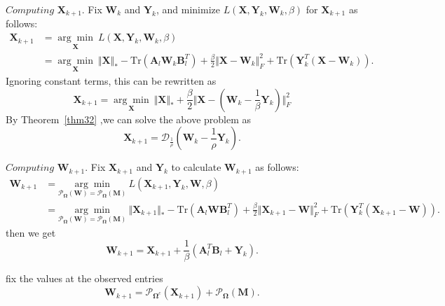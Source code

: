 \documentclass[fontset=windows]{article}
\begin{document}
{$\textit{Computing}$  $\mathbf X_{k+1}$. Fix $\mathbf W_k$ and $\mathbf Y_k$, and minimize $L(\mathbf X,\mathbf Y_k,\mathbf W_k,\beta)$ for $\mathbf X_{k+1}$ as follows:
\begin{equation}
\begin{aligned}
    \mathbf X_{k+1} & =\underset{\mathbf X}{\arg\min}\ L(\mathbf X,\mathbf Y_k, \mathbf W_k,\beta) \\
    & =  \underset{\mathbf X}{\arg\min} \ \Vert\mathbf X \Vert_* - \text{Tr}(\mathbf A_l\mathbf W_k\mathbf B_l^T)    + \frac{\beta}{2}\Vert\mathbf X-\mathbf W_k \Vert_F^2 + \text{Tr}(\mathbf Y_k^T(\mathbf X-\mathbf W_k)).
\end{aligned}
\end{equation}
Ignoring constant terms, this can be rewritten as 
\begin{equation}
    \mathbf X_{k+1} = \underset{\mathbf X}{\arg\min} \ \Vert\mathbf X \Vert_* + \frac{\beta}{2} \Vert\mathbf X-\left(\mathbf W_k - \frac{1}{\beta}\mathbf Y_k \right) \Vert_F^2
\end{equation}
By Theorem~\ref{thm32} ,we can solve the above problem as
\begin{equation}
    \mathbf X_{k+1} = \mathcal{D}_{\frac{1}{\rho}}(\mathbf W_k - \frac{1}{\rho}\mathbf Y_k).
\label{admmx}
\end{equation}


$\textit{Computing}$  $\mathbf W_{k+1}$. Fix $\mathbf X_{k+1}$ and $\mathbf Y_k$ to calculate $\mathbf W_{k+1}$ as follows:
\begin{equation}
\begin{aligned}
    \mathbf W_{k+1}& = \underset{\mathcal{P}_{\mathbf\Omega}(\mathbf W) = \mathcal{P}_{\mathbf\Omega}(\mathbf M)}{\arg\min} \ L(\mathbf X_{k+1},\mathbf Y_k,\mathbf W,\beta) \\
    & =  \underset{\mathcal{P}_{\mathbf\Omega}(\mathbf W) = \mathcal{P}_{\mathbf\Omega}(\mathbf M)}{\arg\min} \ \Vert\mathbf X_{k+1}\Vert_* - \text{Tr}(\mathbf A_l \mathbf W \mathbf B_l^T)    + \frac{\beta}{2}\Vert\mathbf X_{k+1}-\mathbf W \Vert_F^2 + \text{Tr}(\mathbf Y_k^T(\mathbf X_{k+1}-\mathbf W)).
\end{aligned}
\end{equation}
then we get
\begin{equation}
    \mathbf W_{k+1} = \mathbf X_{k+1} + \frac{1}{\beta}(\mathbf A_l^T\mathbf B_l + \mathbf Y_k).
\end{equation}

fix the values at the observed entries
\begin{equation}
    \mathbf W_{k+1} = \mathcal{P}_{\mathbf  \Omega^c}(\mathbf X_{k+1}) + \mathcal{P}_{\mathbf \Omega}(\mathbf M).
\end{equation}

}
\end{document}
